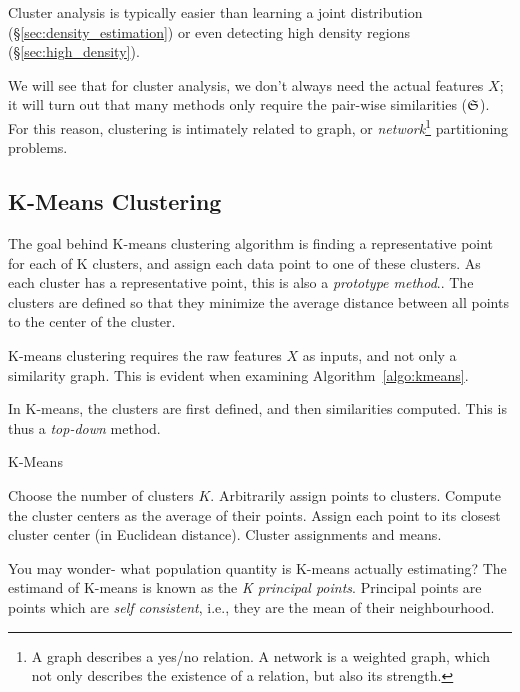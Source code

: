 Cluster analysis is typically easier than learning a joint distribution (\S\ref{sec:density_estimation}) or even detecting high density regions (\S\ref{sec:high_density}). 

We will see that for cluster analysis, we don't always need the actual features $X$; it will turn out that many methods only require the pair-wise similarities ($\mathfrak{S}$). 
For this reason, clustering is intimately related to graph, or \emph{network}\footnote{A graph describes a yes/no relation. A network is a weighted graph, which not only describes the existence of a relation, but also its strength.} partitioning problems.



\subsection{K-Means Clustering}
\label{sec:kmeans}



The goal behind K-means clustering algorithm is finding a representative point for each of K clusters, and assign each data point to one of these clusters. 
As each cluster has a representative point, this is also a \emph{prototype method}..
The clusters are defined so that they minimize the average distance between all points to the center of the cluster.

K-means clustering requires the raw features $X$ as inputs, and not only a similarity graph. 
This is evident when examining Algorithm~\ref{algo:kmeans}.

In K-means, the clusters are first defined, and then similarities computed. This is thus a \emph{top-down} method.

\begin{algorithm}[H]
\caption{K-Means}
\label{algo:kmeans}
\begin{algorithmic}
\State Choose the number of clusters $K$.
\State Arbitrarily assign points to clusters.
	\State Compute the cluster centers as the average of their points.
	\State Assign each point to its closest cluster center (in Euclidean distance).
\EndWhile
\State \Return Cluster assignments and means.
\end{algorithmic}
\end{algorithm}


\begin{remark}
You may wonder- what population quantity is K-means actually estimating?
The estimand of K-means is known as the \emph{K principal points}.
Principal points are points which are \emph{self consistent}, i.e., they are the mean of their neighbourhood. 
\end{remark}




